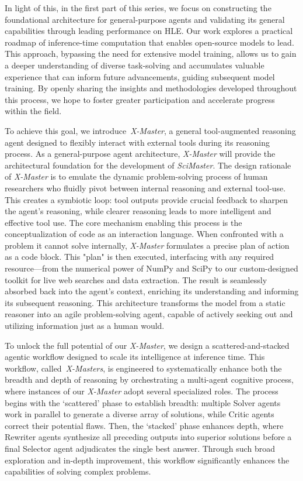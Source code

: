 \documentclass{article}
\begin{document}
In light of this, in the first part of this series, we focus on constructing the foundational architecture for general-purpose agents and validating its general capabilities through leading performance on HLE. Our work explores a practical roadmap of inference-time computation that enables open-source models to lead.
This approach, bypassing the need for extensive model training, allows us to gain a deeper understanding of diverse task-solving and accumulates valuable experience that can inform future advancements, guiding subsequent model training.
By openly sharing the insights and methodologies developed throughout this process, we hope to foster greater participation and accelerate progress within the field.

To achieve this goal, we introduce~\emph{X-Master}, a general tool-augmented reasoning agent designed to flexibly interact with external tools during its reasoning process.
As a general-purpose agent architecture, \emph{X-Master} will provide the architectural foundation for the development of \emph{SciMaster}.
The design rationale of \emph{X-Master} is to emulate the dynamic problem-solving process of human researchers who fluidly pivot between internal reasoning and external tool-use.
This creates a symbiotic loop: tool outputs provide crucial feedback to sharpen the agent's reasoning, while clearer reasoning leads to more intelligent and effective tool use.
The core mechanism enabling this process is the conceptualization of code as an interaction language.
When confronted with a problem it cannot solve internally, \emph{X-Master} formulates a precise plan of action as a code block.
This "plan" is then executed, interfacing with any required resource—from the numerical power of NumPy and SciPy to our custom-designed toolkit for live web searches and data extraction.
The result is seamlessly absorbed back into the agent's context, enriching its understanding and informing its subsequent reasoning.
This architecture transforms the model from a static reasoner into an agile problem-solving agent, capable of actively seeking out and utilizing information just as a human would. 


To unlock the full potential of our \emph{X-Master}, we design a scattered-and-stacked agentic workflow designed to scale its intelligence at inference time.
This workflow, called~\emph{X-Masters}, is engineered to systematically enhance both the breadth and depth of reasoning by orchestrating a multi-agent cognitive process, where instances of our \emph{X-Master} adopt several specialized roles.
The process begins with the `scattered' phase to establish breadth: multiple Solver agents work in parallel to generate a diverse array of solutions, while Critic agents correct their potential flaws.
Then, the `stacked' phase enhances depth, where Rewriter agents synthesize all preceding outputs into superior solutions before a final Selector agent adjudicates the single best answer.
Through such broad exploration and in-depth improvement, this workflow significantly enhances the capabilities of solving complex problems.
\end{document}
